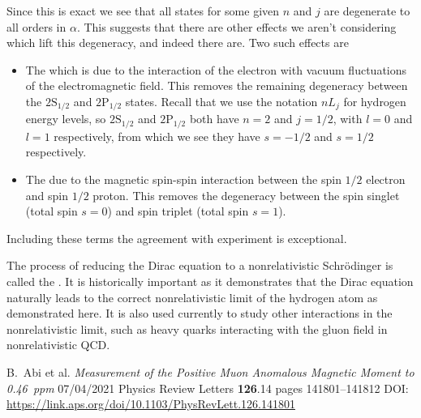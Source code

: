 \documentclass[fleqn]{NotesClass}
\begin{document}
    Since this is exact we see that all states for some given \(n\) and \(j\) are degenerate to all orders in \(\alpha\).
    This suggests that there are other effects we aren't considering which lift this degeneracy, and indeed there are.
    Two such effects are
    \begin{itemize}
        \item The  which is due to the interaction of the electron with vacuum fluctuations of the electromagnetic field.
        This removes the remaining degeneracy between the \(2\mathrm{S}_{1/2}\) and \(2\mathrm{P}_{1/2}\) states.
        Recall that we use the notation \(nL_j\) for hydrogen energy levels, so \(2\mathrm{S}_{1/2}\) and \(2\mathrm{P}_{1/2}\) both have \(n = 2\) and \(j = 1/2\), with \(l = 0\) and \(l = 1\) respectively, from which we see they have \(s = -1/2\) and \(s = 1/2\) respectively.
        
        \item The  due to the magnetic spin-spin interaction between the spin \(1/2\) electron and spin \(1/2\) proton.
        This removes the degeneracy between the spin singlet (total spin \(s = 0\)) and spin triplet (total spin \(s = 1\)).
    \end{itemize}
    Including these terms the agreement with experiment is exceptional.
    
    The process of reducing the Dirac equation to a nonrelativistic Schr\"odinger is called the .
    It is historically important as it demonstrates that the Dirac equation naturally leads to the correct nonrelativistic limit of the hydrogen atom as demonstrated here.
    It is also used currently to study other interactions in the nonrelativistic limit, such as heavy quarks interacting with the gluon field in nonrelativistic QCD.
    
    \appendixpage
    \begin{appendices}
        
        
        
        
    \end{appendices}
    
    \backmatter
    \begin{thebibliography}{9}
         B.~Abi et al. \textit{Measurement of the Positive Muon Anomalous Magnetic Moment to \qty{0.46}{ppm}} 07/04/2021 Physics Review Letters \textbf{126}.14 pages 141801--141812 DOI: \url{https://link.aps.org/doi/10.1103/PhysRevLett.126.141801}
    \end{thebibliography}
    \renewcommand{\glossaryname}{Acronyms}
    \printglossary[acronym]
    \printindex
\end{document}
